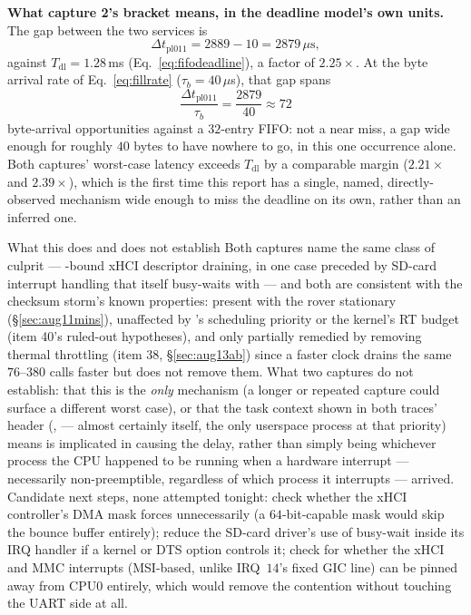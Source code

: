 \noindent\textbf{What capture 2's bracket means, in the deadline model's
own units.} The gap between the two  services is
\begin{equation}
\Delta t_{\mathrm{pl011}} = 2889 - 10 = 2879\,\mu\text{s},
\label{eq:pl011gap}
\end{equation}
against $T_{\mathrm{dl}} = 1.28$\,ms (Eq.~\ref{eq:fifodeadline}), a factor
of $2.25\times$. At the byte arrival rate of Eq.~\ref{eq:fillrate}
($\tau_b = 40\,\mu$s), that gap spans
\begin{equation}
\frac{\Delta t_{\mathrm{pl011}}}{\tau_b} = \frac{2879}{40} \approx 72
\end{equation}
byte-arrival opportunities against a $32$-entry FIFO: not a near miss, a
gap wide enough for roughly $40$ bytes to have nowhere to go, in this one
occurrence alone. Both captures' worst-case latency exceeds
$T_{\mathrm{dl}}$ by a comparable margin ($2.21\times$ and $2.39\times$),
which is the first time this report has a single, named, directly-observed
mechanism wide enough to miss the deadline on its own, rather than an
inferred one.

\begin{trapbox}{What this does and does not establish}
Both captures name the same class of culprit --- -bound
xHCI descriptor draining, in one case preceded by SD-card interrupt
handling that itself busy-waits with  --- and both are
consistent with the checksum storm's known properties: present with the
rover stationary (\S\ref{sec:aug11mins}), unaffected by
's scheduling priority or the kernel's RT budget
(item 40's ruled-out hypotheses), and only partially remedied by removing
thermal throttling (item 38, \S\ref{sec:aug13ab}) since a faster clock
drains the same $76$--$380$  calls faster but does not
remove them. What two captures do not establish: that this is the
\emph{only} mechanism (a longer or repeated capture could surface a
different worst case), or that the task context shown in both traces'
header (,  --- almost certainly
 itself, the only userspace process at that priority)
means  is implicated in causing the delay, rather than
simply being whichever process the CPU happened to be running when a
hardware interrupt --- necessarily non-preemptible, regardless of which
process it interrupts --- arrived. Candidate next steps, none attempted
tonight: check whether the xHCI controller's DMA mask forces
 unnecessarily (a $64$-bit-capable mask would skip the bounce
buffer entirely); reduce the SD-card driver's use of busy-wait 
inside its IRQ handler if a kernel or DTS option controls it; check
 for whether the xHCI and MMC interrupts
(MSI-based, unlike IRQ~$14$'s fixed GIC line) can be pinned away from
CPU0 entirely, which would remove the contention without touching the UART
side at all.
\end{trapbox}

